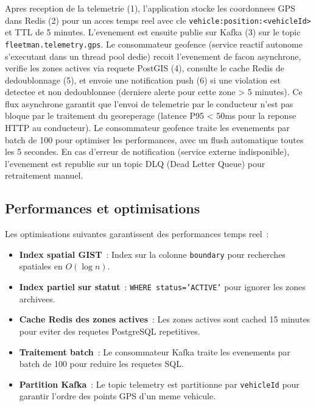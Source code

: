 \documentclass[12pt,a4paper]{report}
\begin{document}
\begin{lecture}
Apres reception de la telemetrie (1), l'application stocke les
coordonnees GPS dans Redis (2) pour un acces temps reel avec cle
\texttt{vehicle:position:<vehicleId>} et TTL de 5 minutes.
L'evenement est ensuite publie sur Kafka (3) sur le topic
\texttt{fleetman.telemetry.gps}. Le consommateur geofence (service
reactif autonome s'executant dans un thread pool dedie) recoit l'evenement
de facon asynchrone, verifie les zones actives via requete PostGIS (4),
consulte le cache Redis de dedoublonnage (5), et envoie une notification
push (6) si une violation est detectee et non dedoublonnee (derniere
alerte pour cette zone > 5 minutes). Ce flux asynchrone garantit que
l'envoi de telemetrie par le conducteur n'est pas bloque par le traitement
du georeperage (latence P95 < 50ms pour la reponse HTTP au conducteur).
Le consommateur geofence traite les evenements par batch de 100 pour
optimiser les performances, avec un flush automatique toutes les 5 secondes.
En cas d'erreur de notification (service externe indisponible), l'evenement
est republie sur un topic DLQ (Dead Letter Queue) pour retraitement manuel.
\end{lecture}

\subsection{Performances et optimisations}

Les optimisations suivantes garantissent des performances temps reel~:

\begin{itemize}[leftmargin=2cm]
  \item \textbf{Index spatial GIST}~: Index sur la colonne \texttt{boundary}
        pour recherches spatiales en $O(\log n)$.
        
  \item \textbf{Index partiel sur statut}~: \texttt{WHERE status='ACTIVE'}
        pour ignorer les zones archivees.
        
  \item \textbf{Cache Redis des zones actives}~: Les zones actives sont
        cached 15 minutes pour eviter des requetes PostgreSQL repetitives.
        
  \item \textbf{Traitement batch}~: Le consommateur Kafka traite les
        evenements par batch de 100 pour reduire les requetes SQL.
        
  \item \textbf{Partition Kafka}~: Le topic telemetry est partitionne
        par \texttt{vehicleId} pour garantir l'ordre des points GPS
        d'un meme vehicule.
\end{itemize}
\end{document}
